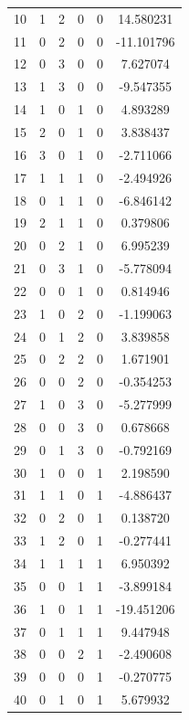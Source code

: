 \documentclass[preprint,12pt]{elsarticle}
\begin{document}
\begin{table}[h!]
\begin{minipage}[h!]{0.23\textwidth}
{\begin{tabular}{|c|ccccc|}
10 &   1 &   2 &   0 &   0 &   14.580231 \\
11 &   0 &   2 &   0 &   0 &  -11.101796 \\
12 &   0 &   3 &   0 &   0 &    7.627074 \\
13 &   1 &   3 &   0 &   0 &   -9.547355 \\
14 &   1 &   0 &   1 &   0 &    4.893289 \\
15 &   2 &   0 &   1 &   0 &    3.838437 \\
16 &   3 &   0 &   1 &   0 &   -2.711066 \\
17 &   1 &   1 &   1 &   0 &   -2.494926 \\
18 &   0 &   1 &   1 &   0 &   -6.846142 \\
19 &   2 &   1 &   1 &   0 &    0.379806 \\
20 &   0 &   2 &   1 &   0 &    6.995239 \\
21 &   0 &   3 &   1 &   0 &   -5.778094 \\
22 &   0 &   0 &   1 &   0 &    0.814946 \\
23 &   1 &   0 &   2 &   0 &   -1.199063 \\
24 &   0 &   1 &   2 &   0 &    3.839858 \\
25 &   0 &   2 &   2 &   0 &    1.671901 \\
26 &   0 &   0 &   2 &   0 &   -0.354253 \\
27 &   1 &   0 &   3 &   0 &   -5.277999 \\
28 &   0 &   0 &   3 &   0 &    0.678668 \\
29 &   0 &   1 &   3 &   0 &   -0.792169 \\
30 &   1 &   0 &   0 &   1 &    2.198590 \\
31 &   1 &   1 &   0 &   1 &   -4.886437 \\
32 &   0 &   2 &   0 &   1 &    0.138720 \\
33 &   1 &   2 &   0 &   1 &   -0.277441 \\
34 &   1 &   1 &   1 &   1 &    6.950392 \\
35 &   0 &   0 &   1 &   1 &   -3.899184 \\
36 &   1 &   0 &   1 &   1 &  -19.451206 \\
37 &   0 &   1 &   1 &   1 &    9.447948 \\
38 &   0 &   0 &   2 &   1 &   -2.490608 \\
39 &   0 &   0 &   0 &   1 &   -0.270775 \\
40 &   0 &   1 &   0 &   1 &    5.679932 \\

\end{tabular}}
\end{minipage}
\end{table}
\end{document}
